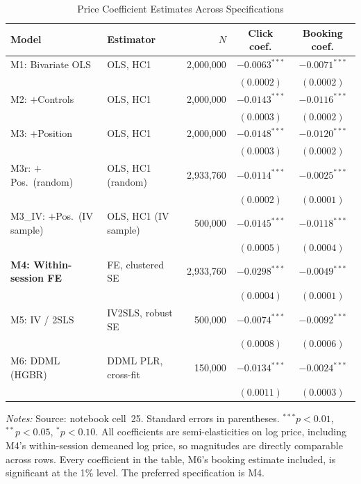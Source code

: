 \documentclass[11pt]{article}
\begin{document}
\begin{table}[htbp]
  \centering
  \caption{Price Coefficient Estimates Across Specifications}
  \label{tab:regression}
  \small
  \begin{tabular}{llrcc}
    \toprule
    Model & Estimator & $N$ & Click coef. & Booking coef. \\
    \midrule
    M1: Bivariate OLS      & OLS, HC1              & 2,000,000 & $-0.0063^{***}$ & $-0.0071^{***}$ \\
                           &                       &           & $(0.0002)$ & $(0.0002)$ \\
    M2: $+$Controls        & OLS, HC1              & 2,000,000 & $-0.0143^{***}$ & $-0.0116^{***}$ \\
                           &                       &           & $(0.0003)$ & $(0.0002)$ \\
    M3: $+$Position        & OLS, HC1              & 2,000,000 & $-0.0148^{***}$ & $-0.0120^{***}$ \\
                           &                       &           & $(0.0003)$ & $(0.0002)$ \\
    M3r: $+$Pos.\ (random) & OLS, HC1 (random)     & 2,933,760 & $-0.0114^{***}$ & $-0.0025^{***}$ \\
                           &                       &           & $(0.0002)$ & $(0.0001)$ \\
    M3\_IV: $+$Pos.\ (IV sample) & OLS, HC1 (IV sample) & 500,000 & $-0.0145^{***}$ & $-0.0118^{***}$ \\
                           &                       &           & $(0.0005)$ & $(0.0004)$ \\
    \textbf{M4: Within-session FE} & FE, clustered SE & 2,933,760 & $\mathbf{-0.0298^{***}}$ & $\mathbf{-0.0049^{***}}$ \\
                           &                       &           & $(0.0004)$ & $(0.0001)$ \\
    M5: IV / 2SLS          & IV2SLS, robust SE     & 500,000   & $-0.0074^{***}$ & $-0.0092^{***}$ \\
                           &                       &           & $(0.0008)$ & $(0.0006)$ \\
    M6: DDML (HGBR)        & DDML PLR, cross-fit   & 150,000   & $-0.0134^{***}$ & $-0.0024^{***}$ \\
                           &                       &           & $(0.0011)$ & $(0.0003)$ \\
    \bottomrule
  \end{tabular}
  \vspace{0.6ex}
  \begin{minipage}{0.95\textwidth}
  \footnotesize \textit{Notes:} Source: notebook cell~25. Standard
  errors in parentheses. $^{***}p<0.01$, $^{**}p<0.05$, $^{*}p<0.10$. All
  coefficients are semi-elasticities on log price, including M4's
  within-session demeaned log price, so magnitudes are directly comparable
  across rows. Every coefficient in the table, M6's booking estimate included,
  is significant at the 1\% level. The preferred specification is M4.
  \end{minipage}
\end{table}
\end{document}
